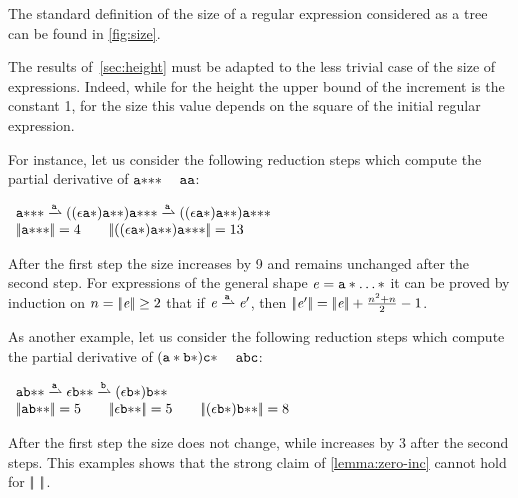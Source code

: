The standard definition of the size of a regular expression considered as a tree can be found in \cref{fig:size}.

The results of~\cref{sec:height} must be adapted to the less trivial case of the size of expressions. Indeed, while for the height the upper bound of the increment is the constant 1, for the size this value depends on the square of the initial regular expression.

For instance, let us consider the following reduction steps which compute the partial derivative of ${{{\mathtt {a}}*}*}*$
\wrt~ $\mathtt {a}\mathtt {a}$:
\begin{flushleft}
 $
  \begin{array}{l}
   \starop{\starop{\starop{\sym}}}\parDer{\sym}((\eps\catop\starop{\sym})\catop\starop{\starop{\sym}})\catop\starop{\starop{\starop{\sym}}}\parDer{\sym}((\eps\catop\starop{\sym})\catop\starop{\starop{\sym}})\catop\starop{\starop{\starop{\sym}}} \\
   \tsize{\starop{\starop{\starop{\sym}}}}=4\qquad  \tsize{((\eps\catop\starop{\sym})\catop\starop{\starop{\sym}})\catop\starop{\starop{\starop{\sym}}}}=13
  \end{array}
 $
\end{flushleft}
After the first step the size increases by 9 and remains unchanged after the second step.
For expressions of the general shape $\mathit {e}={\mathtt {a}}*\ldots*$ it can be proved by induction on $n={{\mid\!\mid}}{\mathit {e}}{{\mid\!\mid}}\geq 2$ that if $\re\parDer{\sym}\re'$, then
${{\mid\!\mid}}{\mathit {e}'}{{\mid\!\mid}}={{\mid\!\mid}}{\mathit {e}}{{\mid\!\mid}}+\frac{n^2+n}{2}-1$.

As another example, let us consider the following reduction steps which compute the partial derivative of $({\mathtt {a}}*{\mathtt {b}}*){\mathtt {c}}*$
\wrt~ $\mathtt {a}\mathtt {b}\mathtt {c}$:
\begin{flushleft}
 $
  \begin{array}{l}
   \sym\catop\starop{\starop{\asym}}\parDer{\sym}\eps\catop\starop{\starop{\asym}}\parDer{\asym}(\eps\catop\starop{\asym})\catop\starop{\starop{\asym}} \\
   \tsize{\sym\catop\starop{\starop{\asym}}}=5\qquad  \tsize{\eps\catop\starop{\starop{\asym}}}=5 \qquad \tsize{(\eps\catop\starop{\asym})\catop\starop{\starop{\asym}}}=8
  \end{array}
 $
\end{flushleft}
After the first step the size does not change, while increases by 3 after the second steps. This examples shows that the strong claim of \cref{lemma:zero-inc} cannot hold for ${{\mid\!\mid}}{\ }{{\mid\!\mid}}$.

